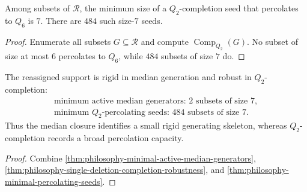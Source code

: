 \begin{theorem}
\label{thm:philosophy-minimal-percolating-seeds}
Among subsets of $\mathcal{R}$, the minimum size of a
$Q_{2}$-completion seed that percolates to $Q_{6}$ is $7$. There are
$484$ such size-$7$ seeds.
\end{theorem}
\begin{proof}
Enumerate all subsets $G\subseteq\mathcal{R}$ and compute
$\operatorname{Comp}_{Q_{2}}(G)$. No subset of size at most $6$
percolates to $Q_{6}$, while $484$ subsets of size $7$ do.
\end{proof}

\begin{theorem}
\label{thm:philosophy-generator-closure-robustness}
The reassigned support is rigid in median generation and robust in
$Q_{2}$-completion:
$$
\begin{gathered}
  \text{minimum active median generators: }2\text{ subsets of size }7,\\
  \text{minimum }Q_{2}\text{-percolating seeds: }484\text{ subsets of size }7.
\end{gathered}
$$
Thus the median closure identifies a small rigid generating skeleton,
whereas $Q_{2}$-completion records a broad percolation capacity.
\end{theorem}
\begin{proof}
Combine
\autoref{thm:philosophy-minimal-active-median-generators},
\autoref{thm:philosophy-single-deletion-completion-robustness}, and
\autoref{thm:philosophy-minimal-percolating-seeds}.
\end{proof}

